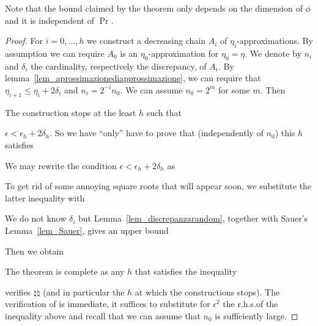 \documentclass[sputnik.tex]{subfiles}
\begin{document}
Note that the bound claimed by the theorem only depends on the dimension of $\phi$ and it is independent of $\Pr$.

\begin{proof}
For $i=0,\dots,h$ we construct a decreasing chain $A_i$ of $\eta_i$-approximations.
By assumption we can require $A_0$ is an $\eta_0$-approximation for $\eta_0=\eta$.
We denote by $n_i$ and $\delta_i$ the cardinality, respectively the discrepancy, of $A_i$.
By lemma~\ref{lem_aprossimazionediapprossimazione}, we can require that $\eta_{i+1}\le\eta_i+2\delta_i$ and $n_i=2^{-i}n_0$. We can assume $n_0=2^m$ for some $m$.
Then


The construction stops at the least $h$ such that 





$\epsilon<\epsilon_h+2\delta_h$.
So we have ``only'' have to prove that (independently of $n_0$) this $h$ satisfies


We may rewrite the condition $\epsilon<\epsilon_h+2\delta_h$ as


To get rid of some annoying square roots that will appear soon, we substitute the latter inequality with


% 

We do not know $\delta_i$ but Lemma~\ref{lem_discrepanzarandom}, together with Sauer's Lemma~\ref{lem_Sauer}, gives an upper bound




Then we obtain


The theorem is complete as any $h$ that satisfies the inequality


verifies $\natural\natural$ (and in particular the $h$ at which the constructions stops).
The verification of is immediate, it suffices to substitute for $\epsilon^2$ the r.h.s.\@ of the inequality above and recall that we can assume that $n_0$ is sufficiently large.
\end{proof}
\end{document}
